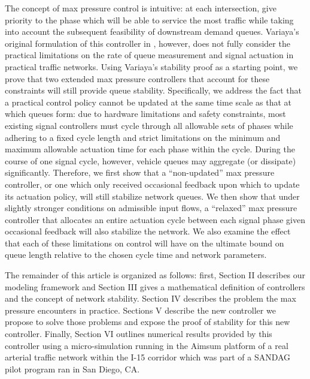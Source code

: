 The concept of max pressure control is intuitive: at each intersection, give priority to the phase which will be able to service the most traffic while taking into account the subsequent feasibility of downstream demand queues. Variaya's original formulation of this controller in \cite{MaxPressureStochastic}, however, does not fully consider the practical limitations on the rate of queue measurement and signal actuation in practical traffic networks. Using Variaya's stability proof as a starting point, we prove that two extended max pressure controllers that account for these constraints will still provide queue stability. Specifically, we address the fact that a practical control policy cannot be updated at the same time scale as that at which queues form: due to hardware limitations and safety constraints, most existing signal controllers must cycle through all allowable sets of phases while adhering to a fixed cycle length and strict limitations on the minimum and maximum allowable actuation time for each phase within the cycle. During the course of one signal cycle, however, vehicle queues may aggregate (or dissipate) significantly. Therefore, we first show that a ``non-updated'' max pressure controller, or one which only received occasional feedback upon which to update its actuation policy, will still stabilize network queues. We then show that under slightly stronger conditions on admissible input flows, a ``relaxed'' max pressure controller that allocates an entire actuation cycle between each signal phase given occasional feedback will also stabilize the network. We also examine the effect that each of these limitations on control will have on the ultimate bound on queue length relative to the chosen cycle time and network parameters. 

The remainder of this article is organized as follows: first, Section II describes our modeling framework and Section III gives a mathematical definition of controllers and the concept of network stability. Section IV describes the problem the max pressure encounters in practice. Sections V describe the new controller we propose to solve those problems and expose the proof of stability for this new controller. Finally, Section VI outlines  numerical results provided by this controller using a micro-simulation running in the Aimsum platform of a real arterial traffic network within the I-15 corridor which was part of a SANDAG pilot program ran in San Diego, CA. 




